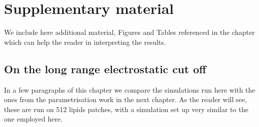 

\section{Supplementary material} \label{sec:ch3_SI}

We include here additional material, Figures and Tables referenced in the chapter which can help the reader in interpreting the results.


\subsection{On the long range electrostatic cut off}
In a few paragraphs of this chapter we compare the simulations run here with the ones from the parametrisation work in the next chapter. As the reader will see, these are run on 512 lipids patches, with a simulation set up very similar to the one employed here.

